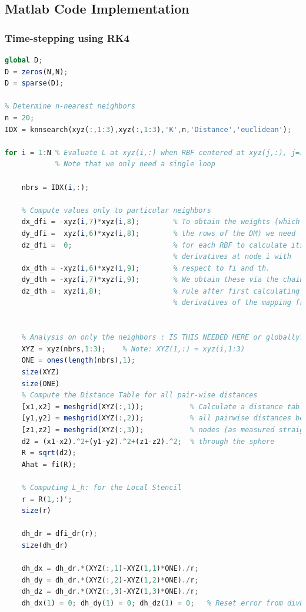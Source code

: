 \documentclass[11pt]{article}
\begin{document}
\subsection{Matlab Code Implementation}

\subsubsection{Time-stepping using RK4}
\begin{lstlisting}[language=octave]
% RBF-FD Differentiation Matrix
global D;       
D = zeros(N,N);
D = sparse(D);

% Determine n-nearest neighbors
n = 20;
IDX = knnsearch(xyz(:,1:3),xyz(:,1:3),'K',n,'Distance','euclidean');

for i = 1:N % Evaluate L at xyz(i,:) when RBF centered at xyz(j,:), j=1:m
            % Note that we only need a single loop
            
    nbrs = IDX(i,:);
    
    % Compute values only to particular neighbors
    dx_dfi = -xyz(i,7)*xyz(i,8);        % To obtain the weights (which form 
    dy_dfi =  xyz(i,6)*xyz(i,8);        % the rows of the DM) we need  
    dz_dfi =  0;                        % for each RBF to calculate its
                                        % derivatives at node i with
    dx_dth = -xyz(i,6)*xyz(i,9);        % respect to fi and th.
    dy_dth = -xyz(i,7)*xyz(i,9);        % We obtain these via the chain
    dz_dth =  xyz(i,8);                 % rule after first calculating 
                                        % derivatives of the mapping from
    
                                        
    % Analysis on only the neighbors : IS THIS NEEDED HERE or globally?
    XYZ = xyz(nbrs,1:3);    % Note: XYZ(1,:) = xyz(i,1:3)
    ONE = ones(length(nbrs),1);
    size(XYZ)
    size(ONE)
    % Compute the Distance Table for all pair-wise distances
    [x1,x2] = meshgrid(XYZ(:,1));           % Calculate a distance table for
    [y1,y2] = meshgrid(XYZ(:,2));           % all pairwise distances between
    [z1,z2] = meshgrid(XYZ(:,3));           % nodes (as measured straight
    d2 = (x1-x2).^2+(y1-y2).^2+(z1-z2).^2;  % through the sphere
    R = sqrt(d2);
    Ahat = fi(R);
    
    % Computing L_h: for the Local Stencil
    r = R(1,:)';
    size(r)
    
    dh_dr = dfi_dr(r);
    size(dh_dr)
    
    dh_dx = dh_dr.*(XYZ(:,1)-XYZ(1,1)*ONE)./r;
    dh_dy = dh_dr.*(XYZ(:,2)-XYZ(1,2)*ONE)./r;
    dh_dz = dh_dr.*(XYZ(:,3)-XYZ(1,3)*ONE)./r;
    dh_dx(1) = 0; dh_dy(1) = 0; dh_dz(1) = 0;   % Reset error from divByZero


\end{lstlisting}
\end{document}
